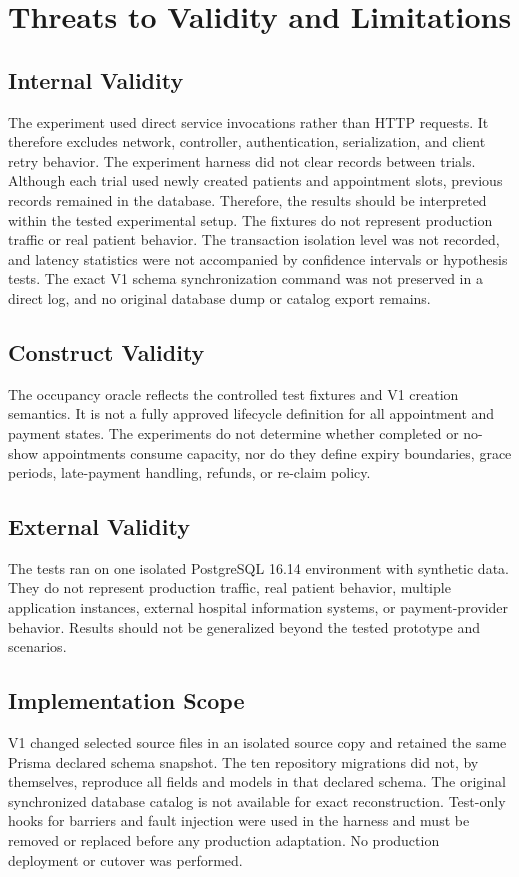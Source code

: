 \documentclass[conference]{IEEEtran}
\begin{document}
\section{Threats to Validity and Limitations}
\subsection{Internal Validity}
The experiment used direct service invocations rather than HTTP requests. It therefore excludes network, controller, authentication, serialization, and client retry behavior. The experiment harness did not clear records between trials. Although each trial used newly created patients and appointment slots, previous records remained in the database. Therefore, the results should be interpreted within the tested experimental setup. The fixtures do not represent production traffic or real patient behavior. The transaction isolation level was not recorded, and latency statistics were not accompanied by confidence intervals or hypothesis tests. The exact V1 schema synchronization command was not preserved in a direct log, and no original database dump or catalog export remains.

\subsection{Construct Validity}
The occupancy oracle reflects the controlled test fixtures and V1 creation semantics. It is not a fully approved lifecycle definition for all appointment and payment states. The experiments do not determine whether completed or no-show appointments consume capacity, nor do they define expiry boundaries, grace periods, late-payment handling, refunds, or re-claim policy.

\subsection{External Validity}
The tests ran on one isolated PostgreSQL 16.14 environment with synthetic data. They do not represent production traffic, real patient behavior, multiple application instances, external hospital information systems, or payment-provider behavior. Results should not be generalized beyond the tested prototype and scenarios.

\subsection{Implementation Scope}
V1 changed selected source files in an isolated source copy and retained the same Prisma declared schema snapshot. The ten repository migrations did not, by themselves, reproduce all fields and models in that declared schema. The original synchronized database catalog is not available for exact reconstruction. Test-only hooks for barriers and fault injection were used in the harness and must be removed or replaced before any production adaptation. No production deployment or cutover was performed.
\end{document}
